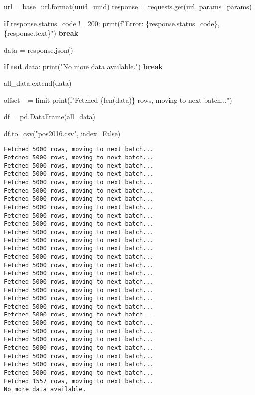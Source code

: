 \documentclass[
  letterpaper,
  DIV=11,
  numbers=noendperiod]{scrartcl}
\newenvironment{Shaded}{\begin{snugshade}}{\end{snugshade}}
\newcommand{\BuiltInTok}[1]{\textcolor[rgb]{0.00,0.23,0.31}{#1}}
\newcommand{\ControlFlowTok}[1]{\textcolor[rgb]{0.00,0.23,0.31}{\textbf{#1}}}
\newcommand{\DecValTok}[1]{\textcolor[rgb]{0.68,0.00,0.00}{#1}}
\newcommand{\KeywordTok}[1]{\textcolor[rgb]{0.00,0.23,0.31}{\textbf{#1}}}
\newcommand{\NormalTok}[1]{\textcolor[rgb]{0.00,0.23,0.31}{#1}}
\newcommand{\OperatorTok}[1]{\textcolor[rgb]{0.37,0.37,0.37}{#1}}
\newcommand{\SpecialCharTok}[1]{\textcolor[rgb]{0.37,0.37,0.37}{#1}}
\newcommand{\SpecialStringTok}[1]{\textcolor[rgb]{0.13,0.47,0.30}{#1}}
\newcommand{\StringTok}[1]{\textcolor[rgb]{0.13,0.47,0.30}{#1}}
\newcommand{\VariableTok}[1]{\textcolor[rgb]{0.07,0.07,0.07}{#1}}
\begin{document}
\begin{Shaded}
\begin{Highlighting}[]
\NormalTok{    url }\OperatorTok{=}\NormalTok{ base\_url.}\BuiltInTok{format}\NormalTok{(uuid}\OperatorTok{=}\NormalTok{uuid)}
\NormalTok{    response }\OperatorTok{=}\NormalTok{ requests.get(url, params}\OperatorTok{=}\NormalTok{params)}

    \ControlFlowTok{if}\NormalTok{ response.status\_code }\OperatorTok{!=} \DecValTok{200}\NormalTok{:}
        \BuiltInTok{print}\NormalTok{(}\SpecialStringTok{f"Error: }\SpecialCharTok{\{}\NormalTok{response}\SpecialCharTok{.}\NormalTok{status\_code}\SpecialCharTok{\}}\SpecialStringTok{, }\SpecialCharTok{\{}\NormalTok{response}\SpecialCharTok{.}\NormalTok{text}\SpecialCharTok{\}}\SpecialStringTok{"}\NormalTok{)}
        \ControlFlowTok{break}

\NormalTok{    data }\OperatorTok{=}\NormalTok{ response.json()}

    \ControlFlowTok{if} \KeywordTok{not}\NormalTok{ data:}
        \BuiltInTok{print}\NormalTok{(}\StringTok{"No more data available."}\NormalTok{)}
        \ControlFlowTok{break}

\NormalTok{    all\_data.extend(data)}

\NormalTok{    offset }\OperatorTok{+=}\NormalTok{ limit}
    \BuiltInTok{print}\NormalTok{(}\SpecialStringTok{f"Fetched }\SpecialCharTok{\{}\BuiltInTok{len}\NormalTok{(data)}\SpecialCharTok{\}}\SpecialStringTok{ rows, moving to next batch..."}\NormalTok{)}

\NormalTok{df }\OperatorTok{=}\NormalTok{ pd.DataFrame(all\_data)}


\NormalTok{df.to\_csv(}\StringTok{"pos2016.csv"}\NormalTok{, index}\OperatorTok{=}\VariableTok{False}\NormalTok{)}
\end{Highlighting}
\end{Shaded}

\begin{verbatim}
Fetched 5000 rows, moving to next batch...
Fetched 5000 rows, moving to next batch...
Fetched 5000 rows, moving to next batch...
Fetched 5000 rows, moving to next batch...
Fetched 5000 rows, moving to next batch...
Fetched 5000 rows, moving to next batch...
Fetched 5000 rows, moving to next batch...
Fetched 5000 rows, moving to next batch...
Fetched 5000 rows, moving to next batch...
Fetched 5000 rows, moving to next batch...
Fetched 5000 rows, moving to next batch...
Fetched 5000 rows, moving to next batch...
Fetched 5000 rows, moving to next batch...
Fetched 5000 rows, moving to next batch...
Fetched 5000 rows, moving to next batch...
Fetched 5000 rows, moving to next batch...
Fetched 5000 rows, moving to next batch...
Fetched 5000 rows, moving to next batch...
Fetched 5000 rows, moving to next batch...
Fetched 5000 rows, moving to next batch...
Fetched 5000 rows, moving to next batch...
Fetched 5000 rows, moving to next batch...
Fetched 5000 rows, moving to next batch...
Fetched 5000 rows, moving to next batch...
Fetched 5000 rows, moving to next batch...
Fetched 5000 rows, moving to next batch...
Fetched 5000 rows, moving to next batch...
Fetched 5000 rows, moving to next batch...
Fetched 1557 rows, moving to next batch...
No more data available.
\end{verbatim}
\end{document}
